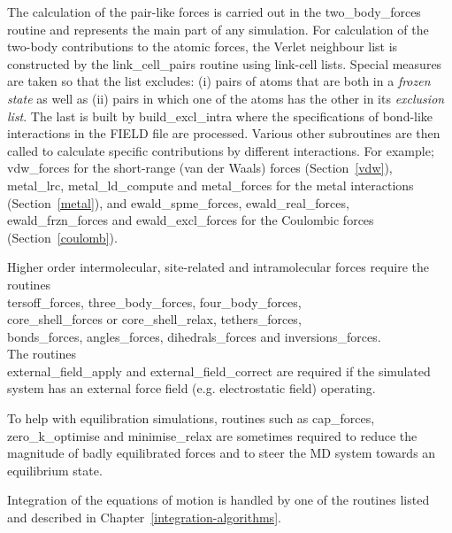 The calculation of the pair-like forces is carried out in the
{\sc two\_body\_forces} routine and represents the main part of any
simulation.  For calculation of the two-body contributions to the
atomic forces, the Verlet neighbour list
is constructed by the {\sc link\_cell\_pairs} routine using link-cell
lists.  Special measures are taken so that the list excludes: (i)
pairs of atoms that are both in a {\em frozen state} as well as (ii)
pairs in which one of the atoms has the other in its
{\em exclusion list}.  The last is built by {\sc build\_excl\_intra}
where the specifications of bond-like interactions in the FIELD file
are processed.  Various other subroutines are then called to
calculate specific contributions by different interactions.  For example;
{\sc vdw\_forces} for the short-range (van der Waals)
forces (Section~\ref{vdw}), {\sc metal\_lrc}, {\sc metal\_ld\_compute} and
{\sc metal\_forces} for the metal interactions 
(Section~\ref{metal}), and {\sc ewald\_spme\_forces}, {\sc ewald\_real\_forces},
{\sc ewald\_frzn\_forces} and {\sc ewald\_excl\_forces} for the
Coulombic forces (Section~\ref{coulomb}).

Higher order intermolecular, site-related
and intramolecular forces
require the routines \\
{\sc tersoff\_forces}, {\sc three\_body\_forces},
{\sc four\_body\_forces}, \\
{\sc core\_shell\_forces} or {\sc core\_shell\_relax},
{\sc tethers\_forces}, \\
{\sc bonds\_forces}, {\sc angles\_forces}, {\sc dihedrals\_forces}
and {\sc inversions\_forces}.  \\
The routines \\
{\sc external\_field\_apply} and {\sc external\_field\_correct}
are required if the simulated system has an external force field
(e.g. electrostatic field) operating.

To help with equilibration simulations, routines such as
{\sc cap\_forces}, {\sc zero\_k\_optimise} and {\sc minimise\_relax}
are sometimes required to reduce the magnitude of badly
equilibrated forces and to steer the MD system towards an
equilibrium state.

Integration of the equations of motion is handled by one of the
routines listed and described in Chapter~\ref{integration-algorithms}.


